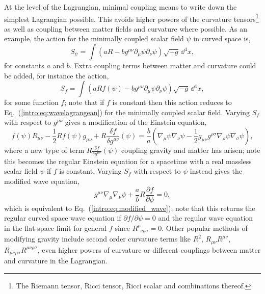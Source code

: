 At the level of the Lagrangian, minimal coupling means to write down the simplest Lagrangian possible. This avoids higher powers of the curvature tensors\footnote{The Riemann tensor, Ricci tensor, Ricci scalar and combinations thereof.} as well as coupling between matter fields and curvature where possible. As an example, the action for the minimally coupled scalar field $\psi$ in curved space is,
\begin{equation}
S_\psi = \int \left( aR - b g^{\mu\nu}\partial_\mu \psi \partial_\nu \psi \right) \sqrt{-g}\,\dd^4 x, \label{intro:eq:wavelagrangean}
\end{equation}
for constants $a$ and $b$. Extra coupling terms between matter and curvature could be added, for instance the action,
\begin{equation}
S_f = \int \left( aRf(\psi) - b g^{\mu\nu}\partial_\mu \psi \partial_\nu \psi \right) \sqrt{-g}\,\dd^4 x,
\end{equation}
for some function $f$; note that if $f$ is constant then this action reduces to Eq.~(\ref{intro:eq:wavelagrangean}) for the minimally coupled scalar field. Varying $S_f$ with respect to $g^{\mu\nu}$ gives a modification of the Einstein equation,
\begin{equation}
f(\psi) R_{\mu\nu} - \frac{1}{2} R f(\psi)g_{\mu\nu} + R \frac{\delta f}{\delta g^{\mu\nu}}(\psi) = \frac{b}{a} \left(\nabla_\mu \psi \nabla_\nu \psi-\frac{1}{2} g_{\mu\nu} g^{\rho\sigma}\nabla_\rho \psi \nabla_\sigma\psi  \right), 
\end{equation}
where a new type of term $ R \frac{\delta f}{\delta g^{\mu\nu}}(\psi)$ coupling gravity and matter has arisen; note this becomes the regular Einstein equation for a spacetime with a real massless scalar field $\psi$ if $f$ is constant. Varying $S_f$ with respect to $\psi$ instead gives the modified wave equation,
\begin{equation}
g^{\mu\nu}\nabla_\mu \nabla_\nu \psi + \frac{a}{b}R \frac{\partial f}{\partial \psi} =0,
\end{equation}
which is equivalent to Eq.~(\ref{intro:eq:modified_wave}); note that this returns the regular curved space wave equation if $\partial f / \partial \psi=0$ and the regular wave equation in the flat-space limit for general $f$ since $R^\mu_{\,\,\,\nu\rho\sigma}=0$. Other popular methods of modifying gravity include second order curvature terms like $R^2$, $R_{\mu\nu}R^{\mu\nu}$, $R_{\mu\nu\rho\sigma}R^{\mu\nu\rho\sigma}$, even higher powers of curvature or different couplings between matter and curvature in the Lagrangian.

